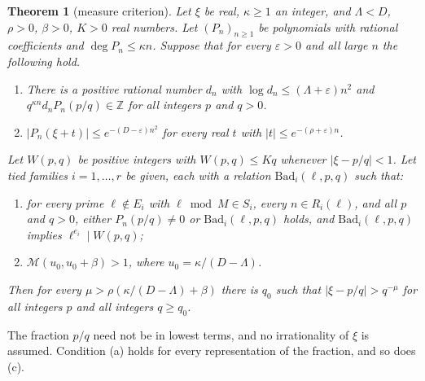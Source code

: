 \documentclass[11pt]{amsart}
\newtheorem{theorem}{Theorem}[section]
\theoremstyle{definition}
\theoremstyle{remark}
\numberwithin{equation}{section}
\newcommand{\Z}{\mathbb Z}
\newcommand{\cM}{\mathcal M}
\begin{document}
\begin{theorem}[measure criterion]\label{thm:criterion}
Let $\xi$ be real, $\kappa\ge1$ an integer, and $\Lambda<D$, $\rho>0$, $\beta>0$, $K>0$ real numbers. Let $(P_n)_{n\ge1}$
be polynomials with rational coefficients and $\deg P_n\le\kappa n$. Suppose that for every $\varepsilon>0$ and all
large $n$ the following hold.
\begin{enumerate}[label=(\alph*)]
\item There is a positive rational number $d_n$ with $\log d_n\le(\Lambda+\varepsilon)n^2$ and $q^{\kappa n}d_nP_n(p/q)\in\Z$
 for all integers $p$ and $q>0$.
\item $|P_n(\xi+t)|\le e^{-(D-\varepsilon)n^2}$ for every real $t$ with $|t|\le e^{-(\rho+\varepsilon)n}$.
\end{enumerate}
Let $W(p,q)$ be positive integers with $W(p,q)\le Kq$ whenever $|\xi-p/q|<1$. Let tied families $i=1,\dots,r$ be
given, each with a relation $\mathrm{Bad}_i(\ell,p,q)$ such that:
\begin{enumerate}[label=(\alph*),resume]
\item for every prime $\ell\notin E_i$ with $\ell\bmod M\in S_i$, every $n\in R_i(\ell)$, and all $p$ and $q>0$, either
 $P_n(p/q)\ne0$ or $\mathrm{Bad}_i(\ell,p,q)$ holds, and $\mathrm{Bad}_i(\ell,p,q)$ implies
 $\ell^{e_i}\mid W(p,q)$;
\item $\cM(u_0,u_0+\beta)>1$, where $u_0=\kappa/(D-\Lambda)$.
\end{enumerate}
Then for every $\mu>\rho(\kappa/(D-\Lambda)+\beta)$ there is $q_0$ such that $|\xi-p/q|>q^{-\mu}$ for all integers $p$
and all integers $q\ge q_0$.
\end{theorem}

The fraction $p/q$ need not be in lowest terms, and no irrationality of $\xi$ is assumed. Condition (a) holds for
every representation of the fraction, and so does (c).
\end{document}
